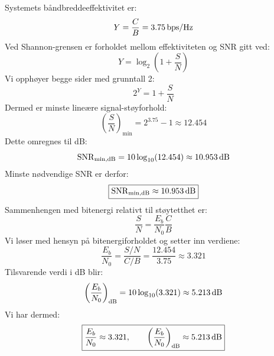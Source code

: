 Systemets båndbreddeeffektivitet er:
\[
    Y=\frac{C}{B}=3.75\,\mathrm{bps/Hz}
\]
Ved Shannon-grensen er forholdet mellom effektiviteten og SNR gitt ved:
\[
    Y=\log_2\!\left(1+\frac{S}{N}\right)
\]
Vi opphøyer begge sider med grunntall 2:
\[
    2^Y=1+\frac{S}{N}
\]
Dermed er minste lineære signal-støyforhold:
\[
    \left(\frac{S}{N}\right)_{\min}=2^{3.75}-1
                                \approx12.454
\]
Dette omregnes til dB:
\[
    \mathrm{SNR}_{\min,\mathrm{dB}}
       =10\log_{10}(12.454)\approx10.953\,\mathrm{dB}
\]
Minste nødvendige SNR er derfor:
\[
    \boxed{\mathrm{SNR}_{\min,\mathrm{dB}}\approx10.953\,\mathrm{dB}}
\]
Sammenhengen med bitenergi relativt til støytetthet er:
\[
    \frac{S}{N}=\frac{E_b}{N_0}\frac{C}{B}
\]
Vi løser med hensyn på bitenergiforholdet og setter inn verdiene:
\[
    \frac{E_b}{N_0}=\frac{S/N}{C/B}
                  =\frac{12.454}{3.75}
                  \approx3.321
\]
Tilsvarende verdi i dB blir:
\[
    \left(\frac{E_b}{N_0}\right)_{\mathrm{dB}}
       =10\log_{10}(3.321)\approx5.213\,\mathrm{dB}
\]
Vi har dermed:
\[
    \boxed{\frac{E_b}{N_0}\approx3.321,
    \qquad \left(\frac{E_b}{N_0}\right)_{\mathrm{dB}}\approx5.213\,\mathrm{dB}}
\]
